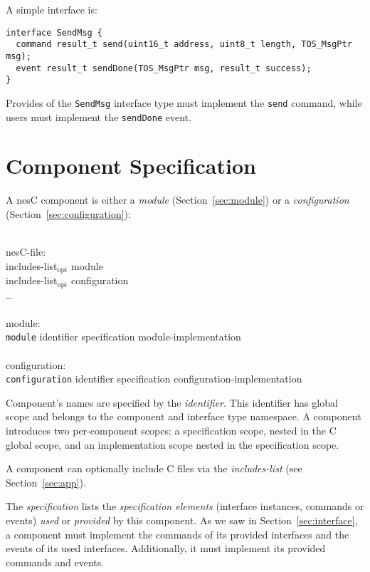 \documentclass[11pt]{article}
\newcommand{\kw}[1]{{\tt #1}}
\newcommand{\code}[1]{{\tt #1}}
\newcommand{\nesc}{nesC\xspace}
\newcommand{\opt}{$_{\mbox{opt}}$\xspace}
\begin{document}
A simple interface is:
\begin{verbatim}
interface SendMsg { 
  command result_t send(uint16_t address, uint8_t length, TOS_MsgPtr msg);
  event result_t sendDone(TOS_MsgPtr msg, result_t success);
}
\end{verbatim}

Provides of the \code{SendMsg} interface type must implement the
\code{send} command, while users must implement the \code{sendDone} event.

\section{Component Specification}
\label{sec:component}

A \nesc component is either a \emph{module} (Section~\ref{sec:module}) or a
\emph{configuration} (Section~\ref{sec:configuration}):
\em \begin{tabbing}
\hspace*{2cm}\= \\ \kill
nesC-file: \\
\>	includes-list\opt module\\
\>	includes-list\opt configuration\\
\>	\ldots\\
\\
module:\\
\>	\kw{module} identifier specification module-implementation\\
\\
configuration:\\
\>	\kw{configuration} identifier specification configuration-implementation\\
\end{tabbing} \rm
Component's names are specified by the \emph{identifier}. This identifier
has global scope and belongs to the component and interface type namespace.
A component introduces two per-component scopes: a specification scope,
nested in the C global scope, and an implementation scope nested in the
specification scope.

A component can optionally include C files via the \emph{includes-list}
(see Section~\ref{sec:app}).

The \emph{specification} lists the \emph{specification elements} (interface
instances, commands or events) \emph{used} or \emph{provided} by this
component. As we saw in Section~\ref{sec:interface}, a component must
implement the commands of its provided interfaces and the events of its
used interfaces. Additionally, it must implement its provided commands and
events.
\end{document}
